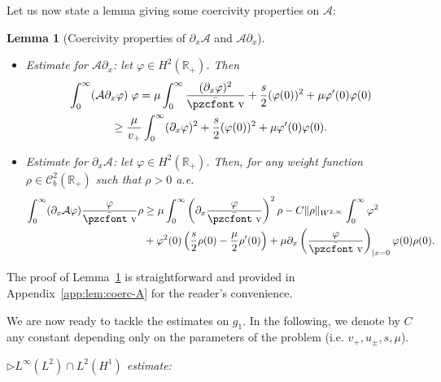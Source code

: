 \documentclass[10pt]{amsart}
\newtheorem{lemm}[theo]{Lemma}\newtheorem{prop}[theo]{Proposition}\newtheorem{coro}[theo]{Corollary}\newtheorem{conj}[theo]{Conjecture}
\theoremstyle{definition}\newtheorem{defi}[theo]{Definition}\newtheorem{rema}[theo]{Remark}\newtheorem{exam}[theo]{Example}\newtheorem{exem}[theo]{Example}\newtheorem{nota}[theo]{Notation}
\newcommand{\mathpzc}[1]{\text{\pzcfont #1}}
\newcommand{\R}{\mathbb{R}}
\newcommand{\p}{\partial}
\newcommand{\bv}{\bar{\mathpzc{v}}}
\newcommand{\cA}{\mathcal A}
\newcommand{\cC}{\mathcal C}
\begin{document}
Let us now state a lemma giving some coercivity properties on $\cA$:
\begin{lemm}[Coercivity properties of $\p_x \cA$ and $\cA \p_x$]\label{lem:coerc-A}\leavevmode
\begin{itemize}
\item Estimate for $\cA \p_x$: let $\varphi \in H^2(\R_+)$. Then
\begin{multline*}
\int_0^\infty (\cA \p_x \varphi)\; \varphi  = \mu\int_0^\infty \frac{(\p_x \varphi)^2}{\bv} + \frac{s}{2}(\varphi(0))^2 + \mu \varphi'(0) \varphi(0) \\
\geq \frac{\mu}{v_+} \int_0^\infty (\p_x \varphi)^2+ \frac{s}{2}(\varphi(0))^2 + \mu \varphi'(0) \varphi(0).
\end{multline*}
\item Estimate for $ \p_x\cA$: let $\varphi \in H^2(\R_+)$. Then, for any weight function $\rho\in \cC^2_b(\R_+)$ such that $\rho>0$ a.e.
\begin{align*}
\int_0^\infty (\p_x \cA \varphi) \frac{\varphi }{\bv} \rho &\geq \mu \int_0^\infty \left(\p_x \frac{\varphi }{\bv}\right)^2 \rho -C\|\rho\|_{W^{2,\infty}}\int_0^\infty \varphi ^2 \\&+\varphi ^2(0)\left(\frac{s}{2} \rho(0)- \frac{\mu}{2}\rho'(0)\right) + \mu\p_x\left(\frac{\varphi }{\bv}\right)_{|x=0} \varphi (0) \rho(0).
\end{align*}
\end{itemize}
\end{lemm}
The proof of Lemma~\ref{lem:coerc-A} is straightforward and provided in Appendix~\ref{app:lem:coerc-A} for the reader's convenience.



We are now ready to tackle the estimates on $g_1$. In the following, we denote by $C$ any constant depending only on the parameters of the problem (i.e. $v_+, u_\pm, s, \mu$).

$\rhd${\it $L^\infty(L^2)\cap L^2(H^1)$ estimate:}
\end{document}

